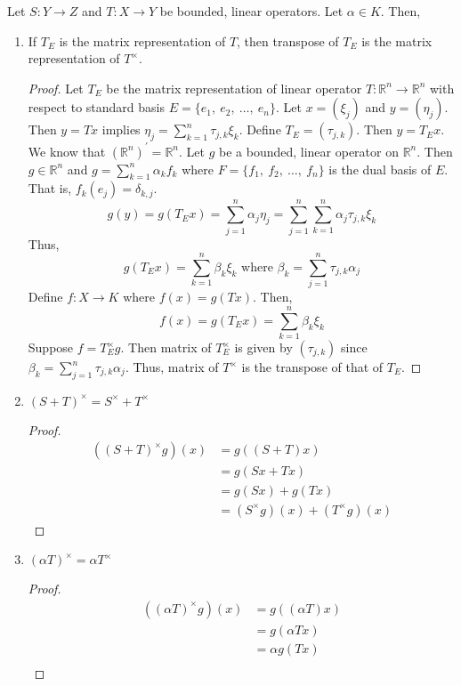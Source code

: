 \begin{remark}
	Let $S : Y \to Z$ and $T : X \to Y$ be bounded, linear operators.
	Let $\alpha \in K$.
	Then,
\begin{enumerate}
	\item If $T_{E}$ is the matrix representation of $T$, then transpose of $T_{E}$ is the matrix representation of $T^\times$.
	\begin{proof}
		Let $T_E$ be the matrix representation of linear operator $T : \mathbb{R}^n \to \mathbb{R}^n$ with respect to standard basis $E = \{ e_1,\ e_2,\ \dots,\ e_n \}$.
		Let $x = (\xi_j)$ and $y = (\eta_j)$.
		Then $y = Tx$ implies $\displaystyle \eta_j = \sum_{k=1}^n \tau_{j,k} \xi_k$.
		Define $T_E = (\tau_{j,k})$.
		Then $y = T_E x$.
		We know that $(\mathbb{R}^n)^\prime = \mathbb{R}^n$.
		Let $g$ be a bounded, linear operator on $\mathbb{R}^n$.
		Then $g \in \mathbb{R}^n$ and $\displaystyle g = \sum_{k = 1}^n \alpha_k f_k$ where $F = \{ f_1,\ f_2,\ \dots,\ f_n\}$ is the dual basis of $E$.
		That is, $f_k(e_j) = \delta_{k,j}$.
		\[ g(y) = g(T_E x) = \sum_{j = 1}^n \alpha_j \eta_j = \sum_{j = 1}^n \sum_{k=1}^n \alpha_j \tau_{j,k}\xi_k \]
		Thus,
		\[ g(T_E x) = \sum_{k=1}^n \beta_k \xi_k \text{ where } \beta_k = \sum_{j=1}^n \tau_{j,k} \alpha_j \]
		Define $f : X \to K$ where $f(x) = g(Tx)$.
		Then,
		\[ f(x) = g(T_E x) = \sum_{k=1}^n \beta_k \xi_k \]
		Suppose $f = T_E^\times g$.
		Then matrix of $T_E^\times$ is given by $(\tau_{j,k})$ since $\displaystyle \beta_k = \sum_{j=1}^n \tau_{j,k} \alpha_j$.
		Thus, matrix of $T^\times$ is the transpose of that of $T_E$.
	\end{proof}
	\item $(S+T)^\times = S^\times + T^\times$
	\begin{proof}
	\begin{align*}
		((S+T)^\times g)(x)
		& = g((S+T)x)  \\
		& = g(Sx + Tx) \\
		& = g(Sx) + g(Tx) \\
		& = (S^\times g)(x) + (T^\times g)(x)
	\end{align*}
	\end{proof}
	\item $(\alpha T)^\times = \alpha T^\times$
	\begin{proof}
	\begin{align*}
		((\alpha T)^\times g)(x)
		& = g((\alpha T)x) \\
		& = g(\alpha Tx) \\
		& = \alpha g(Tx) \\

\end{align*}
\end{proof}
\end{enumerate}
\end{remark}
